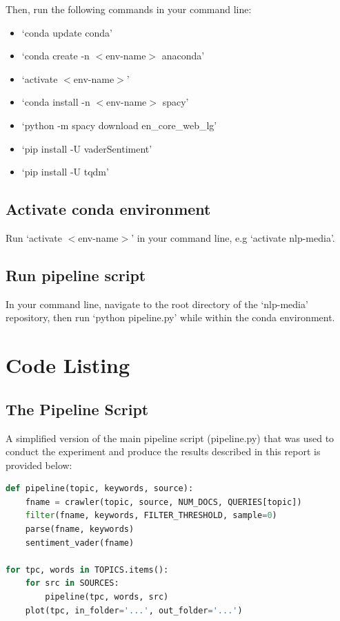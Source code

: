 \documentclass{report}
\begin{document}
\noindent Then, run the following commands in your command line:
\begin{itemize}
	\item `conda update conda'
	\item `conda create -n $<$env-name$>$ anaconda'
	\item `activate $<$env-name$>$'
	\item `conda install -n $<$env-name$>$ spacy'
	\item `python -m spacy download en\_core\_web\_lg'
	\item `pip install -U vaderSentiment'
	\item `pip install -U tqdm'
\end{itemize}

\section{Activate conda environment}

Run `activate $<$env-name$>$' in your command line, e.g `activate nlp-media'.

\section{Run pipeline script}

In your command line, navigate to the root directory of the `nlp-media' repository, then run `python pipeline.py' while within the conda environment.

\chapter{Code Listing}

\section{The Pipeline Script}

A simplified version of the main pipeline script (pipeline.py) that was used to conduct the experiment and produce the results described in this report is provided below:

\begin{lstlisting}[language=Python]
def pipeline(topic, keywords, source):
	fname = crawler(topic, source, NUM_DOCS, QUERIES[topic])
	filter(fname, keywords, FILTER_THRESHOLD, sample=0)
	parse(fname, keywords)
	sentiment_vader(fname)

for tpc, words in TOPICS.items():
	for src in SOURCES:
		pipeline(tpc, words, src)
	plot(tpc, in_folder='...', out_folder='...')
\end{lstlisting}
\end{document}
